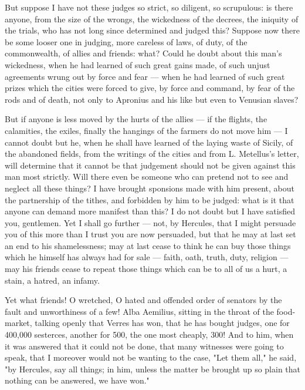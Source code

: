  But suppose I have not these judges so strict, so diligent, so scrupulous: is there anyone, from the size of the wrongs, the wickedness of the decrees, the iniquity of the trials, who has not long since determined and judged this? Suppose now there be some looser one in judging, more careless of laws, of duty, of the commonwealth, of allies and friends: what? Could he doubt about this man's wickedness, when he had learned of such great gains made, of such unjust agreements wrung out by force and fear --- when he had learned of such great prizes which the cities were forced to give, by force and command, by fear of the rods and of death, not only to Apronius and his like but even to Venusian slaves?

 But if anyone is less moved by the hurts of the allies --- if the flights, the calamities, the exiles, finally the hangings of the farmers do not move him --- I cannot doubt but he, when he shall have learned of the laying waste of Sicily, of the abandoned fields, from the writings of the cities and from L. Metellus's letter, will determine that it cannot be that judgement should not be given against this man most strictly. Will there even be someone who can pretend not to see and neglect all these things? I have brought sponsions made with him present, about the partnership of the tithes, and forbidden by him to be judged: what is it that anyone can demand more manifest than this? I do not doubt but I have satisfied you, gentlemen. Yet I shall go further --- not, by Hercules, that I might persuade you of this more than I trust you are now persuaded, but that he may at last set an end to his shamelessness; may at last cease to think he can buy those things which he himself has always had for sale --- faith, oath, truth, duty, religion --- may his friends cease to repeat those things which can be to all of us a hurt, a stain, a hatred, an infamy.

 Yet what friends! O wretched, O hated and offended order of senators by the fault and unworthiness of a few! Alba Aemilius, sitting in the throat of the food-market, talking openly that Verres has won, that he has bought judges, one for 400,000 sesterces, another for 500, the one most cheaply, 300! And to him, when it was answered that it could not be done, that many witnesses were going to speak, that I moreover would not be wanting to the case, "Let them all," he said, "by Hercules, say all things; in him, unless the matter be brought up so plain that nothing can be answered, we have won."

